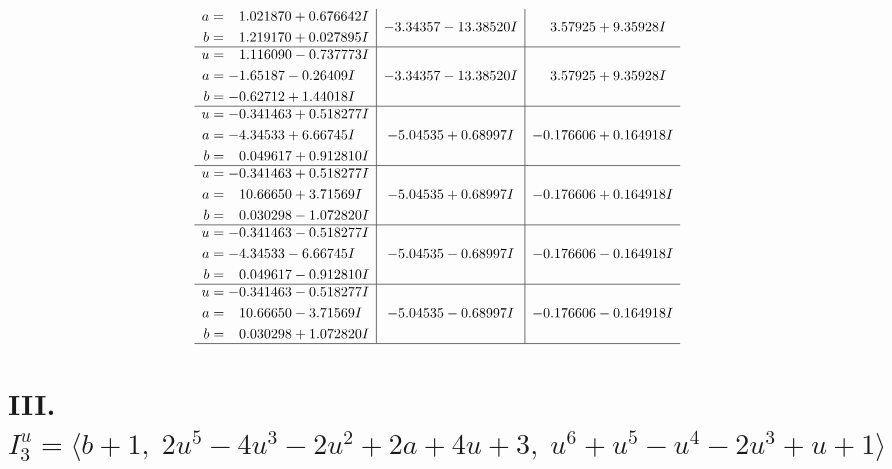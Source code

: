 \documentclass[1p]{elsarticle_modified}
\theoremstyle{definition}
\begin{document}
$$\begin{array}{c|c|c}
\begin{aligned}
a &= \phantom{-}1.021870 + 0.676642 I \\
b &= \phantom{-}1.219170 + 0.027895 I\end{aligned}
 & -3.34357 - 13.38520 I & \phantom{-}3.57925 + 9.35928 I \\ \hline\begin{aligned}
u &= \phantom{-}1.116090 - 0.737773 I \\
a &= -1.65187 - 0.26409 I \\
b &= -0.62712 + 1.44018 I\end{aligned}
 & -3.34357 - 13.38520 I & \phantom{-}3.57925 + 9.35928 I \\ \hline\begin{aligned}
u &= -0.341463 + 0.518277 I \\
a &= -4.34533 + 6.66745 I \\
b &= \phantom{-}0.049617 + 0.912810 I\end{aligned}
 & -5.04535 + 0.68997 I & -0.176606 + 0.164918 I \\ \hline\begin{aligned}
u &= -0.341463 + 0.518277 I \\
a &= \phantom{-}10.66650 + 3.71569 I \\
b &= \phantom{-}0.030298 - 1.072820 I\end{aligned}
 & -5.04535 + 0.68997 I & -0.176606 + 0.164918 I \\ \hline\begin{aligned}
u &= -0.341463 - 0.518277 I \\
a &= -4.34533 - 6.66745 I \\
b &= \phantom{-}0.049617 - 0.912810 I\end{aligned}
 & -5.04535 - 0.68997 I & -0.176606 - 0.164918 I \\ \hline\begin{aligned}
u &= -0.341463 - 0.518277 I \\
a &= \phantom{-}10.66650 - 3.71569 I \\
b &= \phantom{-}0.030298 + 1.072820 I\end{aligned}
 & -5.04535 - 0.68997 I & -0.176606 - 0.164918 I\\
 \hline 
 \end{array}$$\newpage\newpage\renewcommand{\arraystretch}{1}
\centering \section*{III. $I^u_{3}= \langle b+1,\;2 u^5-4 u^3-2 u^2+2 a+4 u+3,\;u^6+u^5- u^4-2 u^3+u+1 \rangle$}
\end{document}
